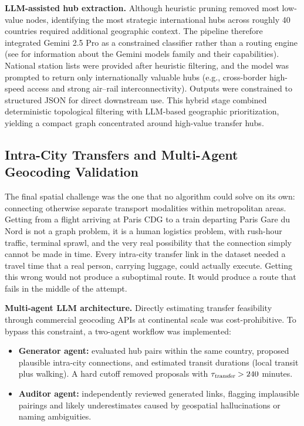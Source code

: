 \medskip

\noindent\textbf{LLM-assisted hub extraction.}
Although heuristic pruning removed most low-value nodes, identifying the most strategic international hubs across roughly 40 countries required additional geographic context. The pipeline therefore integrated Gemini 2.5 Pro as a constrained classifier rather than a routing engine (see \cite{gemini2023} for information about the Gemini models family and their capabilities). National station lists were provided after heuristic filtering, and the model was prompted to return only internationally valuable hubs (e.g., cross-border high-speed access and strong air--rail interconnectivity). Outputs were constrained to structured JSON for direct downstream use. This hybrid stage combined deterministic topological filtering with LLM-based geographic prioritization, yielding a compact graph concentrated around high-value transfer hubs.

\subsection{Intra-City Transfers and Multi-Agent Geocoding Validation}
\label{subsec:intra_country_transfers_geocoding_validation}
The final spatial challenge was the one that no algorithm could solve on its own: connecting otherwise separate transport modalities within metropolitan areas. Getting from a flight arriving at Paris CDG to a train departing Paris Gare du Nord is not a graph problem, it is a human logistics problem, with rush-hour traffic, terminal sprawl, and the very real possibility that the connection simply cannot be made in time. Every intra-city transfer link in the dataset needed a travel time that a real person, carrying luggage, could actually execute. Getting this wrong would not produce a suboptimal route. It would produce a route that fails in the middle of the attempt.

\medskip

\noindent\textbf{Multi-agent LLM architecture.}
Directly estimating transfer feasibility through commercial geocoding APIs at continental scale was cost-prohibitive. To bypass this constraint, a two-agent workflow was implemented:

\begin{itemize}
  \item \textbf{Generator agent:} evaluated hub pairs within the same country, proposed plausible intra-city connections, and estimated transit durations (local transit plus walking). A hard cutoff removed proposals with $\tau_{\textsl{transfer}} > 240$ minutes.
  \item \textbf{Auditor agent:} independently reviewed generated links, flagging implausible pairings and likely underestimates caused by geospatial hallucinations or naming ambiguities.
\end{itemize}

